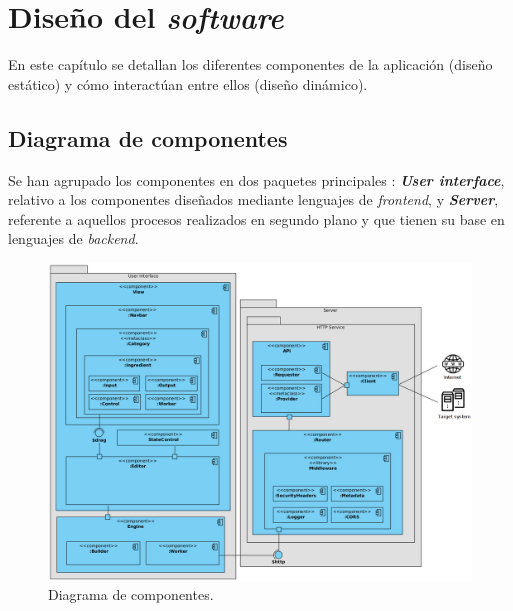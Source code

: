 

\chapter{Diseño del \textit{software}} \label{cap:design}

En este capítulo se detallan los diferentes componentes de la aplicación (diseño estático) y cómo interactúan entre ellos (diseño dinámico).\n


\section{Diagrama de componentes} \label{sec:componentsdiagram}

Se han agrupado los componentes en dos paquetes principales : \textbf{\textit{User interface}}, relativo a los componentes diseñados mediante lenguajes de \textit{frontend}, y \textbf{\textit{Server}}, referente a aquellos procesos realizados en segundo plano y que tienen su base en lenguajes de \textit{backend}.\sn

\begin{figure}[H]
    \centering
    \includegraphics[width=15.5cm]{img/tables/19_Component-Diagram.png}
    \caption{Diagrama de componentes.}
    \label{fig:componentsdiagram}
\end{figure}

